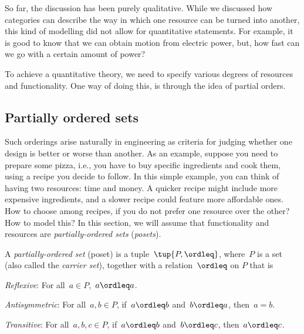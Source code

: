 So far, the discussion has been purely qualitative. While we discussed how
categories can describe the way in which one resource can be turned into another,
this kind of modelling did not allow for quantitative statements. For example, it
is good to know that we can obtain motion from electric power, but, how fast can
we go with a certain amount of power?

To achieve a quantitative theory, we need to specify various degrees of resources and functionality.
One way of doing this, is through the idea of partial orders.

\subsection{Partially ordered sets}
Such orderings arise naturally in engineering as criteria for judging whether one design is better or worse than another. As an example, suppose you need to prepare some pizza, i.e., you have to buy specific ingredients and cook them, using a recipe you decide to follow. In this simple example, you can think of having two resources: time and money. A quicker recipe might include more expensive ingredients, and a slower recipe could feature more affordable ones. How to choose among recipes, if you do not prefer one resource over the other? How to model this? In this section, we will assume that functionality and resources
are \emph{partially-ordered sets} (\emph{posets}).


\begin{definition}
\label{def:poset}
A \emph{partially-ordered set} (poset) is a tuple~$\tup{P, \ordleq}$,
where~$P$ is a set (also called the \emph{carrier set}), together with a
relation~$\ordleq$ on $P$ that is
\begin{compactenum}
    \item \emph{Reflexive}: For all~$a\in P$,~$a\ordleq a$.
    \item \emph{Antisymmetric}: For all~$a,b\in P$, if~$a\ordleq b$ and~$b\ordleq a$, then~$a=b$.
    \item \emph{Transitive}: For all~$a,b,c\in P$, if~$a\ordleq b$ and~$b\ordleq c$, then~$a\ordleq c$.
\end{compactenum}
\end{definition}

